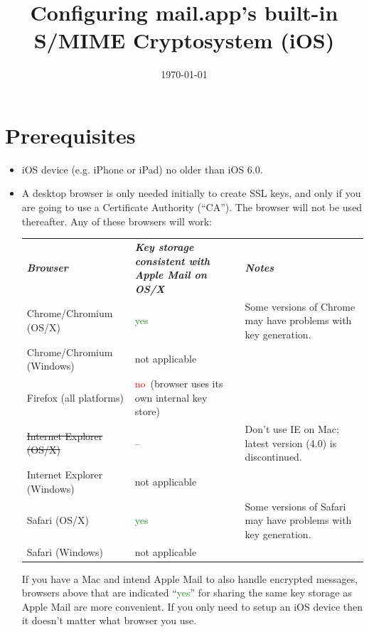 \documentclass[pdftex,12pt,titlepage=false]{scrartcl}
\title{\rmfamily Configuring mail.app's built-in S/MIME Cryptosystem (iOS)}
\date{\rmfamily\today}
\newcommand{\yesgood}{\textcolor{ForestGreen}{yes}}
\newcommand{\nobad}{\textcolor{red}{no}}
\newcommand{\keystoreintl}{\tiny(browser uses its own internal key store)}
\begin{document}
\maketitle

\tableofcontents

\section{Prerequisites}
\begin{itemize}
\item iOS device (e.g. iPhone or iPad) no older than iOS 6.0.
\item A desktop browser is only needed initially to create SSL keys,
  and only if you are going to use a Certificate Authority (``CA'').
  The browser will not be used thereafter.  Any of these browsers will
  work:
  
    \begin{tabular}{lp{50mm}>{\small}p{}}
    \textsl{\textbf{Browser}}          & \textsl{\textbf{Key storage consistent with Apple Mail on OS/X}} & \textsl{\textbf{Notes}}\\
    Chrome/Chromium \tiny(OS/X)        & \yesgood                & Some versions of Chrome may have problems with key generation.\\
    \hline
    Chrome/Chromium \tiny(Windows)     & not applicable          & \\
    \hline
    Firefox \tiny(all platforms)       & \nobad\ \keystoreintl   & \\
    \hline
    \st{Internet Explorer \tiny(OS/X)} & --                      & Don't use IE on Mac; latest version (4.0) is discontinued.\\
    \hline
    Internet Explorer \tiny(Windows)   & not applicable          & \\
    \hline
    Safari \tiny(OS/X)                 & \yesgood                & Some versions of Safari may have problems with key generation.\\
    \hline
    Safari \tiny(Windows)              & not applicable          & \\
  \end{tabular}

  If you have a Mac and intend Apple Mail to also handle encrypted
  messages, browsers above that are indicated ``\yesgood'' for sharing
  the same key storage as Apple Mail are more convenient.  If you only
  need to setup an iOS device then it doesn't matter what browser you
  use.

\end{itemize}
\end{document}
